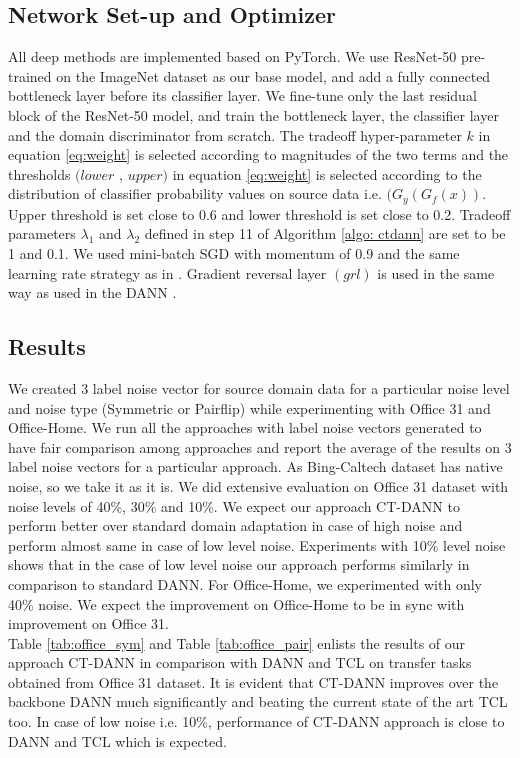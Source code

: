 \subsection{Network Set-up and Optimizer}
All deep methods are implemented based on PyTorch. We use ResNet-50 pre-trained on the ImageNet dataset \cite{imagenet} as our base model, and add a fully connected bottleneck layer before its classifier layer. We fine-tune only the last residual block of the ResNet-50 model, and train the bottleneck layer, the classifier layer and the domain discriminator from scratch. The tradeoff hyper-parameter $k$ in equation \ref{eq:weight} is selected according to magnitudes of the two terms and the thresholds $(lower$ , $upper)$ in equation \ref{eq:weight} is selected according to the distribution of classifier probability values on source data i.e. $(G_{y}(G_{f}(x))$. Upper threshold is set close to 0.6 and lower threshold is set close to 0.2. Tradeoff parameters $\lambda_1$ and $\lambda_2$ defined in step 11 of Algorithm \ref{algo: ctdann} are set to be 1 and 0.1. We used mini-batch SGD with momentum of 0.9 and the same learning rate strategy as in \cite{dann}. Gradient reversal layer $(grl)$ is used in the same way as used in the DANN \cite{dann}.
\subsection{Results}
We created 3 label noise vector for source domain data for a particular noise level and noise type (Symmetric or Pairflip) while experimenting with Office 31 and Office-Home. We run all the approaches with label noise vectors generated to have fair comparison among approaches and report the average of the results on 3 label noise vectors for a particular approach. As Bing-Caltech dataset has native noise, so we take it as it is. We did extensive evaluation on Office 31 dataset with noise levels of 40\%, 30\% and 10\%. We expect our approach CT-DANN to perform better over standard domain adaptation in case of high noise and perform almost same in case of low level noise. Experiments with 10\% level noise shows that in the case of low level noise our approach performs similarly in comparison to standard DANN. For Office-Home, we experimented with only 40\% noise. We expect the improvement on Office-Home to be in sync with improvement on Office 31.\\
Table \ref{tab:office_sym} and Table \ref{tab:office_pair} enlists the results of our approach CT-DANN in comparison with DANN and TCL on transfer tasks obtained from Office 31 dataset. It is evident that CT-DANN improves over the backbone DANN much significantly and beating the current state of the art TCL too. In case of low noise i.e. 10\%, performance of CT-DANN approach is close to DANN and TCL which is expected. 

